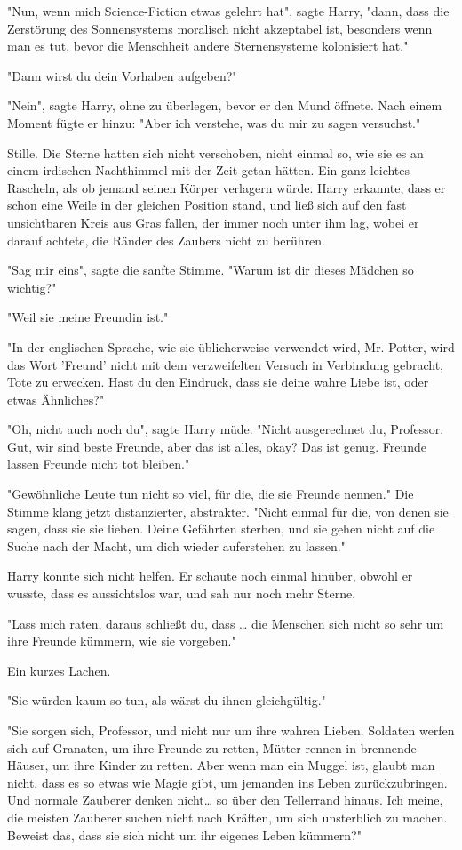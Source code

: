 {"Nun, wenn mich Science-Fiction etwas gelehrt hat", sagte Harry, "dann, dass die Zerstörung des Sonnensystems moralisch nicht akzeptabel ist, besonders wenn man es tut, bevor die Menschheit andere Sternensysteme kolonisiert hat."

"Dann wirst du dein Vorhaben aufgeben?"

"Nein", sagte Harry, ohne zu überlegen, bevor er den Mund öffnete. Nach einem Moment fügte er hinzu: "Aber ich verstehe, was du mir zu sagen versuchst."

Stille. Die Sterne hatten sich nicht verschoben, nicht einmal so, wie sie es an einem irdischen Nachthimmel mit der Zeit getan hätten. Ein ganz leichtes Rascheln, als ob jemand seinen Körper verlagern würde. Harry erkannte, dass er schon eine Weile in der gleichen Position stand, und ließ sich auf den fast unsichtbaren Kreis aus Gras fallen, der immer noch unter ihm lag, wobei er darauf achtete, die Ränder des Zaubers nicht zu berühren.

"Sag mir eins", sagte die sanfte Stimme. "Warum ist dir dieses Mädchen so wichtig?"

"Weil sie meine Freundin ist."

"In der englischen Sprache, wie sie üblicherweise verwendet wird, Mr. Potter, wird das Wort 'Freund' nicht mit dem verzweifelten Versuch in Verbindung gebracht, Tote zu erwecken. Hast du den Eindruck, dass sie deine wahre Liebe ist, oder etwas Ähnliches?"

"Oh, nicht auch noch du", sagte Harry müde. "Nicht ausgerechnet du, Professor. Gut, wir sind beste Freunde, aber das ist alles, okay? Das ist genug. Freunde lassen Freunde nicht tot bleiben."

"Gewöhnliche Leute tun nicht so viel, für die, die sie Freunde nennen." Die Stimme klang jetzt distanzierter, abstrakter. "Nicht einmal für die, von denen sie sagen, dass sie sie lieben. Deine Gefährten sterben, und sie gehen nicht auf die Suche nach der Macht, um dich wieder auferstehen zu lassen."

Harry konnte sich nicht helfen. Er schaute noch einmal hinüber, obwohl er wusste, dass es aussichtslos war, und sah nur noch mehr Sterne.

"Lass mich raten, daraus schließt du, dass … die Menschen sich nicht so sehr um ihre Freunde kümmern, wie sie vorgeben."

Ein kurzes Lachen.

"Sie würden kaum so tun, als wärst du ihnen gleichgültig."

"Sie sorgen sich, Professor, und nicht nur um ihre wahren Lieben. Soldaten werfen sich auf Granaten, um ihre Freunde zu retten, Mütter rennen in brennende Häuser, um ihre Kinder zu retten. Aber wenn man ein Muggel ist, glaubt man nicht, dass es so etwas wie Magie gibt, um jemanden ins Leben zurückzubringen. Und normale Zauberer denken nicht… so über den Tellerrand hinaus. Ich meine, die meisten Zauberer suchen nicht nach Kräften, um sich unsterblich zu machen. Beweist das, dass sie sich nicht um ihr eigenes Leben kümmern?"

}
